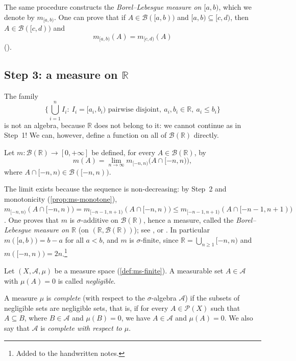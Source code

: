 The same procedure constructs the \emph{Borel--Lebesgue measure on $[a,b)$}, which we denote
by $m_{[a,b)}$. One can prove that if $A\in\mathcal B([a,b))$ and $[a,b)\subseteq[c,d)$, then
$A\in\mathcal B([c,d))$ and
\[
  m_{[a,b)}(A)=m_{[c,d)}(A)
\]
().

\subsection*{Step 3: a measure on \texorpdfstring{$\mathbb R$}{R}}

The family
\[
  \Big\{\bigcup_{i=1}^n I_i:\ I_i=[a_i,b_i)\text{ pairwise disjoint},\ a_i,b_i\in\mathbb R,\ a_i\le b_i\Big\}
\]
is not an algebra, because $\mathbb R$ does not belong to it: we cannot continue as in
Step~1! We can, however, define a function on all of $\mathcal B(\mathbb R)$ directly.

\begin{definition}\label{def:mf-lebesgue}
Let $m:\mathcal B(\mathbb R)\to[0,+\infty]$ be defined, for every $A\in\mathcal B(\mathbb R)$, by
\begin{equation}\label{eq:mf-lebesgue}
  m(A)=\lim_{n\to\infty}m_{[-n,n)}\big(A\cap[-n,n)\big),
\end{equation}
where $A\cap[-n,n)\in\mathcal B([-n,n))$.
\end{definition}

The limit exists because the sequence is non-decreasing: by Step~2 and monotonicity
(\cref{prop:ms-monotone}),
$m_{[-n,n)}(A\cap[-n,n))=m_{[-n-1,n+1)}(A\cap[-n,n))\le m_{[-n-1,n+1)}(A\cap[-n-1,n+1))$.
One proves that $m$ is $\sigma$-additive on $\mathcal B(\mathbb R)$, hence a measure, called
the \emph{Borel--Lebesgue measure on $\mathbb R$} (on $(\mathbb R,\mathcal B(\mathbb R))$);
see , or \citet[Section~12]{billingsley}. In particular $m([a,b))=b-a$ for
all $a<b$, and $m$ is $\sigma$-finite, since $\mathbb R=\bigcup_{n\ge1}[-n,n)$ and
$m([-n,n))=2n$.\footnote{Added to the handwritten notes.}

\begin{definition}\label{def:mf-negligible}
Let $(X,\mathcal A,\mu)$ be a measure space (\cref{def:ms-finite}). A measurable set
$A\in\mathcal A$ with $\mu(A)=0$ is called \emph{negligible}.
\end{definition}

\begin{definition}\label{def:mf-complete}
A measure $\mu$ is \emph{complete} (with respect to the $\sigma$-algebra $\mathcal A$) if the
subsets of negligible sets are negligible sets, that is, if for every $A\in\mathcal P(X)$
such that $A\subseteq B$, where $B\in\mathcal A$ and $\mu(B)=0$, we have $A\in\mathcal A$ and
$\mu(A)=0$. We also say that $\mathcal A$ is \emph{complete with respect to $\mu$}.
\end{definition}

